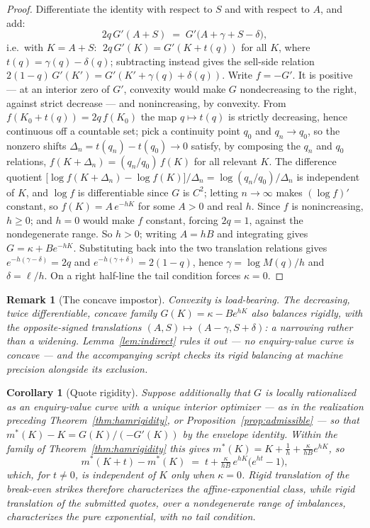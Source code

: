 \documentclass[11pt]{article}
\newtheorem{corollary}{Corollary}
\newtheorem{remark}{Remark}
\begin{document}
\begin{proof}
Differentiate the identity with respect to $S$ and with respect to $A$, and add:
\[
2q\,G'(A+S) \;=\; G'\big(A + \gamma + S - \delta\big),
\]
i.e.\ with $K = A + S$: $\;2q\,G'(K) = G'(K + t(q))$ for all $K$, where $t(q) = \gamma(q) - \delta(q)$; subtracting instead gives the sell-side relation $2(1-q)\,G'(K') = G'(K' + \gamma(q) + \delta(q))$. Write $f = -G'$. It is positive --- at an interior zero of $G'$, convexity would make $G$ nondecreasing to the right, against strict decrease --- and nonincreasing, by convexity. From $f(K_0 + t(q)) = 2q\,f(K_0)$ the map $q \mapsto t(q)$ is strictly decreasing, hence continuous off a countable set; pick a continuity point $q_0$ and $q_n \to q_0$, so the nonzero shifts $\Delta_n = t(q_n) - t(q_0) \to 0$ satisfy, by composing the $q_n$ and $q_0$ relations, $f(K + \Delta_n) = (q_n/q_0)\,f(K)$ for all relevant $K$. The difference quotient $\big[\log f(K + \Delta_n) - \log f(K)\big]/\Delta_n = \log(q_n/q_0)/\Delta_n$ is independent of $K$, and $\log f$ is differentiable since $G$ is $C^2$; letting $n \to \infty$ makes $(\log f)'$ constant, so $f(K) = A\,e^{-hK}$ for some $A > 0$ and real $h$. Since $f$ is nonincreasing, $h \ge 0$; and $h = 0$ would make $f$ constant, forcing $2q = 1$, against the nondegenerate range. So $h > 0$; writing $A = hB$ and integrating gives $G = \kappa + Be^{-hK}$. Substituting back into the two translation relations gives $e^{-h(\gamma - \delta)} = 2q$ and $e^{-h(\gamma + \delta)} = 2(1-q)$, hence $\gamma = \log M(q)/h$ and $\delta = \ell/h$. On a right half-line the tail condition forces $\kappa = 0$.
\end{proof}

\begin{remark}[The concave impostor]
Convexity is load-bearing. The decreasing, twice differentiable, concave family $G(K) = \kappa - Be^{hK}$ also balances rigidly, with the opposite-signed translations $(A, S) \mapsto (A - \gamma, S + \delta)$: a narrowing rather than a widening. Lemma~\ref{lem:indirect} rules it out --- no enquiry-value curve is concave --- and the accompanying script checks its rigid balancing at machine precision alongside its exclusion.
\end{remark}

\begin{corollary}[Quote rigidity]\label{cor:quoterigidity}
Suppose additionally that $G$ is locally rationalized as an enquiry-value curve with a unique interior optimizer --- as in the realization preceding Theorem~\ref{thm:hamrigidity}, or Proposition~\ref{prop:admissible} --- so that $m^\ast(K) - K = G(K)/(-G'(K))$ by the envelope identity. Within the family of Theorem~\ref{thm:hamrigidity} this gives $m^\ast(K) = K + \tfrac1h + \tfrac{\kappa}{hB}e^{hK}$, so
\[
m^\ast(K + t) - m^\ast(K) \;=\; t + \tfrac{\kappa}{hB}\,e^{hK}\big(e^{ht} - 1\big),
\]
which, for $t \neq 0$, is independent of $K$ only when $\kappa = 0$. Rigid translation of the break-even strikes therefore characterizes the affine-exponential class, while rigid translation of the \emph{submitted quotes}, over a nondegenerate range of imbalances, characterizes the pure exponential, with no tail condition.
\end{corollary}
\end{document}
